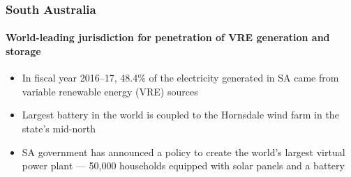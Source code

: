 \documentclass[presentation, smaller, table, svgnames]{beamer}
\begin{document}
\begin{frame}
	\frametitle{South Australia}
	\framesubtitle{World-leading jurisdiction for penetration of VRE generation and storage}
	
	\begin{itemize}
		\item  In fiscal year 2016--17, 48.4\% of the electricity generated in SA came from variable renewable energy (VRE) sources
		\begin{table}[!h]
		\centering
		\label{tbl:sa_reg_cap_elec_gen}
		\caption{Source: Australian Energy Market Operator}
		\end{table}
		
		\item  Largest battery in the world is coupled to the Hornsdale wind farm in the state's mid-north
		
		\item  SA government has announced a policy to create the world's largest virtual power plant --- 50,000 households equipped with solar panels and a battery
		
	\end{itemize}


\end{frame}
\end{document}
